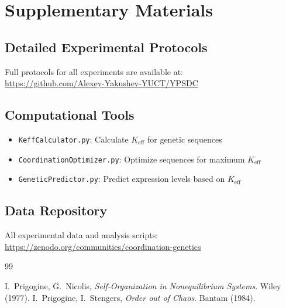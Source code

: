 \documentclass[12pt]{article}
\begin{document}
	\appendix
	\section{Supplementary Materials}
	
	\subsection{Detailed Experimental Protocols}
	
	Full protocols for all experiments are available at:\\
	\url{https://github.com/Alexey-Yakushev-YUCT/YPSDC}
	
	\subsection{Computational Tools}
	
	\begin{itemize}
		\item \texttt{KeffCalculator.py}: Calculate $K_{\text{eff}}$ for genetic sequences
		\item \texttt{CoordinationOptimizer.py}: Optimize sequences for maximum $K_{\text{eff}}$
		\item \texttt{GeneticPredictor.py}: Predict expression levels based on $K_{\text{eff}}$
	\end{itemize}
	
	\subsection{Data Repository}
	
	All experimental data and analysis scripts:\\
	\url{https://zenodo.org/communities/coordination-genetics}
	
\begin{thebibliography}{99}
	
	 I.~Prigogine, G.~Nicolis, \emph{Self‑Organization in Nonequilibrium Systems}. Wiley (1977).
	 I.~Prigogine, I.~Stengers, \emph{Order out of Chaos}. Bantam (1984).
	
\end{thebibliography}
	
\end{document}
